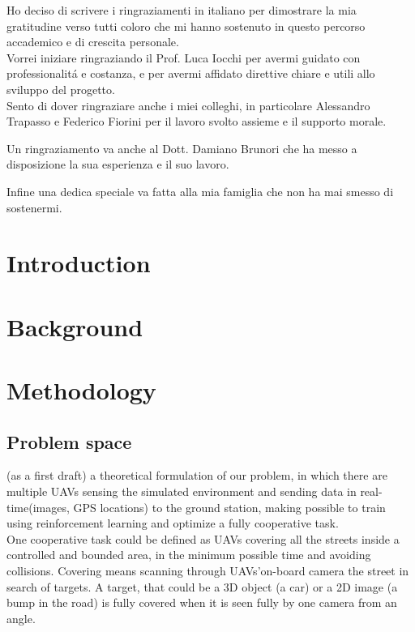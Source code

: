 \documentclass[LaM,binding=0.6cm]{sapthesis}
\begin{document}
\begin{acknowledgments}
Ho deciso di scrivere i ringraziamenti in italiano
per dimostrare la mia gratitudine verso tutti coloro che mi hanno sostenuto in questo percorso accademico e di crescita personale.\\
Vorrei iniziare ringraziando il Prof. Luca Iocchi per avermi guidato con professionalit\'{a} e costanza, e per avermi affidato direttive chiare e utili allo sviluppo del progetto. \\
Sento di dover ringraziare anche i miei colleghi, in particolare Alessandro Trapasso e Federico Fiorini per il lavoro svolto assieme e il supporto morale.

Un ringraziamento va anche al Dott. Damiano Brunori che ha messo a disposizione la sua esperienza e il suo lavoro.

Infine una dedica speciale va fatta alla mia famiglia che non ha mai smesso di sostenermi.

\end{acknowledgments}

\tableofcontents


\chapter{Introduction}

\mainmatter
\chapter{Background} 
\chapter{Methodology}

\section{Problem space}
(as a first draft)
a theoretical formulation of our problem, in which there are multiple UAVs sensing the simulated environment and sending data in real-time(images, GPS locations) to the ground station, making possible to train using reinforcement learning and optimize a fully cooperative task.  \\

One cooperative task could be defined as UAVs covering all the streets inside a controlled and bounded area, in the minimum possible time and avoiding collisions.
Covering means scanning through UAVs'on-board camera the street in search of targets. A target, that could be a 3D object (a car) or a 2D image (a bump in the road) is fully covered when it is seen fully by one camera from an angle.\\
\end{document}
